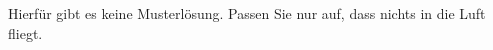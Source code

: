 




Hierfür gibt es keine Musterlösung. Passen Sie nur auf, dass nichts in die
Luft fliegt. \smiley
